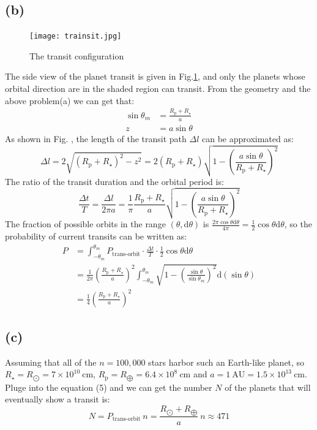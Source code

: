 \documentclass[a4paper,12pt]{article}
\begin{document}
\subsection*{(b)}
\begin{figure}[htbp]
    \centering
    \texttt{[image: trainsit.jpg]}
    \caption{The transit configuration}
    \label{transit}
\end{figure}
The side view of the planet transit is given in Fig.\ref{transit}, and only the planets whose 
orbital direction are in the shaded region can transit. From the geometry and the above problem(a) 
we can get that:
\begin{align*}
    \sin\theta_m & = \frac{R_{\text{p}} + R_{\star}}{a} \\
    z &= a \sin \theta
\end{align*}
As shown in Fig. , the length of the transit path $\Delta l$ can be approximated as:
\begin{equation}
    \Delta l  =2\sqrt{(R_{\text{p}} + R_{\star})^2 - z^2} = 2(R_{\text{p}} + R_{\star}) \sqrt{1 - (\frac{a \sin \theta}{R_{\text{p}} + R_{\star}})^2}
\end{equation}
The ratio of the transit duration and the orbital period is:
\begin{equation} 
    \frac{\Delta t}{T} = \frac{\Delta l}{2\pi a} = \frac{1}{\pi} \frac{R_{\text{p}} + R_{\star}}{a} \sqrt{1 - (\frac{a \sin \theta}{R_{\text{p}} + R_{\star}})^2}
\end{equation}
The fraction of possible orbits in the range $(\theta, \text{d}\theta)$ is $\frac{2\pi \cos \theta \text{d}\theta}{4 \pi} = \frac{1}{2}\cos \theta \text{d}\theta$,
so the probability of current transits can be written as:
\begin{align*}
    P &= \int_{-\theta_m}^{\theta_m} P_{\text{trans-orbit}}  \cdot \frac{\Delta t}{T} \cdot \frac{1}{2}\cos \theta \text{d}\theta  \\
     & = \frac{1}{2\pi} (\frac{R_{\text{p}} + R_{\star}}{a})^2 \int_{-\theta_m}^{\theta_m} \sqrt{1 - (\frac{\sin \theta}{\sin \theta_m})^2} \text{d} (\sin \theta) \\
     & = \frac{1}{4} (\frac{R_{\text{p}} + R_{\star}}{a})^2
\end{align*}

\subsection*{(c)}
Assuming that all of the $n = 100,000$ stars harbor such an Earth-like planet, 
so $R_{\star} = R_{\bigodot} = 7 \times 10^{10} \ \text{cm}$, 
$R_\text{p} = R_{\bigoplus } = 6.4 \times 10^{8} \ \text{cm}$ and 
$a = 1\ \text{AU} = 1.5 \times 10^{13} \ \text{cm}$.
Pluge into the equation (5) and we can get the number $N$
of the planets that will eventually show a transit is:
\begin{equation}
    N = P_{\text{trans-orbit}} \ n  = \frac{R_{\bigodot} + R_{\bigoplus}}{a} \ n \approx 471 
\end{equation}
\end{document}
